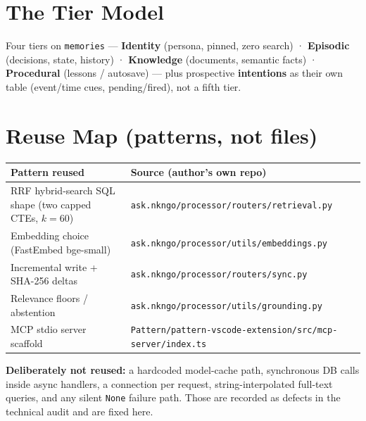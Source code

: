 \section{The Tier Model}
Four tiers on \texttt{memories} --- \textbf{Identity} (persona, pinned, zero search) ·
\textbf{Episodic} (decisions, state, history) · \textbf{Knowledge} (documents, semantic facts) ·
\textbf{Procedural} (lessons / autosave) --- plus prospective \textbf{intentions} as their own
table (event/time cues, pending/fired), not a fifth tier.

\section{Reuse Map (patterns, not files)}
\begin{longtable}{@{}p{}p{}@{}}
\toprule
Pattern reused & Source (author's own repo) \\
\midrule
RRF hybrid-search SQL shape (two capped CTEs, $k{=}60$) & \texttt{ask.nkngo/processor/routers/retrieval.py} \\
Embedding choice (FastEmbed bge-small) & \texttt{ask.nkngo/processor/utils/embeddings.py} \\
Incremental write + SHA-256 deltas & \texttt{ask.nkngo/processor/routers/sync.py} \\
Relevance floors / abstention & \texttt{ask.nkngo/processor/utils/grounding.py} \\
MCP stdio server scaffold & \texttt{Pattern/pattern-vscode-extension/src/mcp-server/index.ts} \\
\bottomrule
\end{longtable}
\noindent\textbf{Deliberately not reused:} a hardcoded model-cache path, synchronous DB calls inside
async handlers, a connection per request, string-interpolated full-text queries, and any silent
\texttt{None} failure path. Those are recorded as defects in the technical audit and are fixed here.
